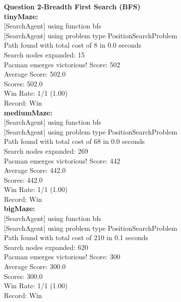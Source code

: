 \documentclass[11pt]{article}
\begin{document}
\newpage
\noindent
\textbf{Question 2-Breadth First Search (BFS)}\\
\textbf{tinyMaze:}\\
$[$SearchAgent$]$ using function bfs\\
$[$SearchAgent$]$ using problem type PositionSearchProblem\\
Path found with total cost of 8 in 0.0 seconds\\
Search nodes expanded: 15\\
Pacman emerges victorious! Score: 502\\
Average Score: 502.0\\
Scores:        502.0\\
Win Rate:      1/1 (1.00)\\
Record:        Win\\

\noindent
\textbf{mediumMaze:}\\
$[$SearchAgent$]$ using function bfs\\
$[$SearchAgent$]$ using problem type PositionSearchProblem\\
Path found with total cost of 68 in 0.0 seconds\\
Search nodes expanded: 269\\
Pacman emerges victorious! Score: 442\\
Average Score: 442.0\\
Scores:        442.0\\
Win Rate:      1/1 (1.00)\\
Record:        Win\\

\noindent
\textbf{bigMaze:}\\
$[$SearchAgent$]$ using function bfs\\
$[$SearchAgent$]$ using problem type PositionSearchProblem\\
Path found with total cost of 210 in 0.1 seconds\\
Search nodes expanded: 620\\
Pacman emerges victorious! Score: 300\\
Average Score: 300.0\\
Scores:        300.0\\
Win Rate:      1/1 (1.00)\\
Record:        Win\\
\end{document}
